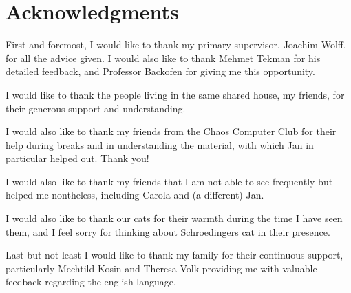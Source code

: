 \chapter{Acknowledgments}

First and foremost, I would like to thank my primary supervisor, Joachim Wolff,
for all the advice given. I would also like to thank Mehmet Tekman for his
detailed feedback, and Professor Backofen for giving me this opportunity.

I would like to thank the people living in the same shared house, my friends,
for their generous support and understanding.

I would also like to thank my friends from the Chaos Computer Club for their
help during breaks and in understanding the material, with which Jan in
particular helped out. Thank you!

I would also like to thank my friends that I am not able to see frequently but
helped me nontheless, including Carola and (a different) Jan.

I would also like to thank our cats for their warmth during the time I have seen
them, and I feel sorry for thinking about Schroedingers cat in their presence.

Last but not least I would like to thank my family for their continuous
support, particularly Mechtild Kosin and Theresa Volk providing me with
valuable feedback regarding the english language.

